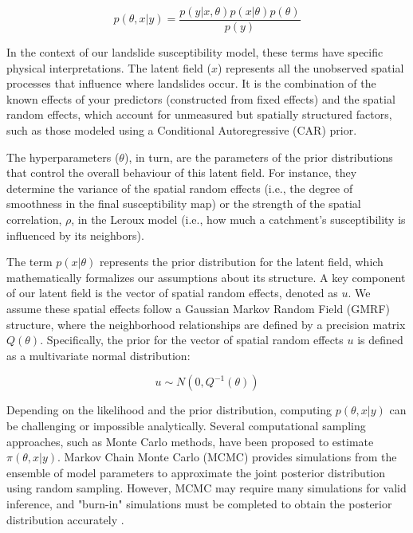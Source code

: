 \documentclass[journal abbreviation, manuscript]{copernicus}
\begin{document}
\begin{equation}
p(\theta,x | y) = \frac{p(y | x,\theta) p(x | \theta) p(\theta)}{p(y)}
\end{equation}

In the context of our landslide susceptibility model, these terms have specific physical interpretations. The latent field ($x$) represents all the unobserved spatial processes that influence where landslides occur. It is the combination of the known effects of your predictors (constructed from fixed effects) and the spatial random effects, which account for unmeasured but spatially structured factors, such as those modeled using a Conditional Autoregressive (CAR) prior.

The hyperparameters ($\theta$), in turn, are the parameters of the prior distributions that control the overall behaviour of this latent field. For instance, they determine the variance of the spatial random effects (i.e., the degree of smoothness in the final susceptibility map) or the strength of the spatial correlation, $\rho$, in the Leroux model (i.e., how much a catchment's susceptibility is influenced by its neighbors).

The term $p(x|\theta)$ represents the prior distribution for the latent field, which mathematically formalizes our assumptions about its structure. A key component of our latent field is the vector of spatial random effects, denoted as $u$. We assume these spatial effects follow a Gaussian Markov Random Field (GMRF) structure, where the neighborhood relationships are defined by a precision matrix $Q(\theta)$. Specifically, the prior for the vector of spatial random effects $u$ is defined as a multivariate normal distribution:

\begin{equation}
u \sim N(0,Q^{-1}(\theta))
\end{equation}

Depending on the likelihood and the prior distribution, computing $p(\theta, x|y)$ can be challenging \citep{gallagher2009markov} or impossible analytically. Several computational sampling approaches, such as Monte Carlo methods, have been proposed to estimate $\pi(\theta, x|y)$. Markov Chain Monte Carlo (MCMC) provides simulations from the ensemble of model parameters \citep{brooks1998markov} to approximate the joint posterior distribution using random sampling. However, MCMC may require many simulations for valid inference, and "burn-in" simulations must be completed to obtain the posterior distribution accurately \citep{jones2022markov}.
\end{document}
